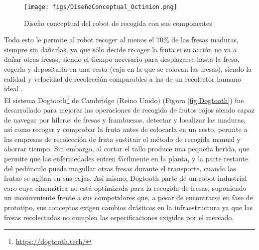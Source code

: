 \begin{figure} [H]
    \begin{center}
      \texttt{[image: figs/DiseñoConceptual\_Octinion.png]}
    \end{center}
    \caption{Diseño conceptual del robot de recogida con sus componentes}
    \label{fig:DiseñoConceptual_Octinion}
\end{figure}

Todo esto le permite al robot recoger al menos el 70\% de las fresas maduras, siempre sin dañarlas, ya que sólo decide recoger la fruta si su acción no va a dañar otras fresas, siendo el tiempo necesario para desplazarse hasta la fresa, cogerla y depositarla en una cesta (caja en la que se colocan las
fresas), %
siendo la calidad y velocidad de recolección comparables a las de un recolector humano ideal \cite{DePreter18}.\\ %


El sistema Dogtooth\footnote{\url{https://dogtooth.tech/}} de Cambridge (Reino Unido) (Figura \ref{fig:Dogtooth}) fue desarrollado para mejorar las operaciones de recogida de frutos rojos siendo capaz de navegar por hileras de fresas y frambuesas, detectar y localizar las maduras, así como recoger y comprobar la fruta antes de colocarla en un cesto, permite a las empresas de recolección de fruta sustituir el método de recogida manual y ahorrar tiempo. Sin embargo, al cortar el tallo produce una pequeña herida, que permite que las enfermedades entren fácilmente en la planta, y la parte restante del pedúnculo puede magullar otras fresas durante el transporte, cuando las frutas se agitan en sus cajas. Así mismo, Dogtooth parte de un robot industrial caro cuya cinemática no está optimizada para la recogida de fresas, suponiendo un inconveniente frente a sus competidores que, a pesar de encontrarse en fase de prototipo, sus conceptos exigen cambios drásticos en la infraestructura ya que las fresas recolectadas no cumplen las especificaciones exigidas por el mercado. 

